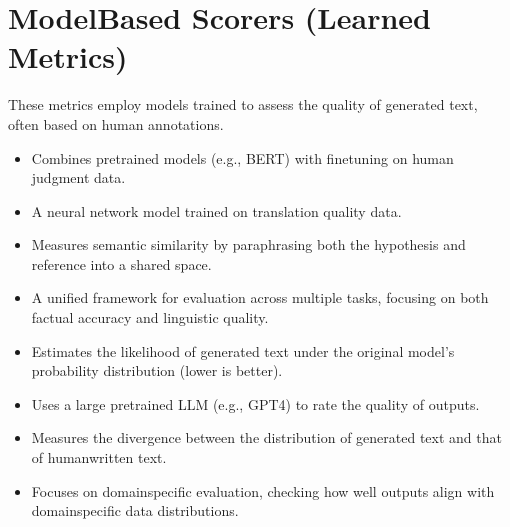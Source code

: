 \documentclass[letterpaper,11pt,english]{sphinxmanual}
\begin{document}
\section{Model\sphinxhyphen{}Based Scorers (Learned Metrics)}
\label{\detokenize{evaluation:model-based-scorers-learned-metrics}}
\sphinxAtStartPar
These metrics employ models trained to assess the quality of generated text,
often based on human annotations.
\begin{itemize}
\item {} 
\sphinxAtStartPar
{}
Combines pre\sphinxhyphen{}trained models (e.g., BERT) with fine\sphinxhyphen{}tuning on human judgment data.

\item {} 
\sphinxAtStartPar
{}
A neural network model trained on translation quality data.

\item {} 
\sphinxAtStartPar
{}
Measures semantic similarity by paraphrasing both the hypothesis and reference into a shared space.

\item {} 
\sphinxAtStartPar
{}
A unified framework for evaluation across multiple tasks, focusing on both factual accuracy and linguistic quality.

\item {} 
\sphinxAtStartPar
{}
Estimates the likelihood of generated text under the original model’s probability distribution (lower is better).

\item {} 
\sphinxAtStartPar
{}
Uses a large pre\sphinxhyphen{}trained LLM (e.g., GPT\sphinxhyphen{}4) to rate the quality of outputs.

\item {} 
\sphinxAtStartPar
{}
Measures the divergence between the distribution of generated text and that of human\sphinxhyphen{}written text.

\item {} 
\sphinxAtStartPar
{}
Focuses on domain\sphinxhyphen{}specific evaluation, checking how well outputs align with domain\sphinxhyphen{}specific data distributions.

\end{itemize}
\end{document}
